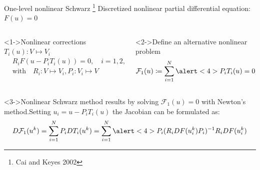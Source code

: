 \begin{frame}{One-level nonlinear Schwarz \footnote{\tiny Cai and Keyes 2002}}%
	Discretized nonlinear partial differential equation: $F(u) = 0$
	\vspace*{-5mm}

	\begin{columns}
		\begin{column}{0.47\textwidth}
			\begin{block}<1->{\normalsize Nonlinear corrections $T_i(u): V\mapsto V_i$}
				\vspace*{-5mm}
				\begin{align*}
					 & R_iF(u-P_iT_i(u))  = 0, \quad i = 1,2,\dots,N                \\
					 & \text{with}\quad R_i:V\mapsto V_i\text{,}\, P_i:V_i\mapsto V
				\end{align*}
			\end{block}
		\end{column}
        \hspace{-3mm}
		\begin{column}{0.47\textwidth}
			\begin{block}<2->{\normalsize Define an alternative nonlinear problem}
				\begin{equation*}
					\mathcal{F}_1(u) \coloneqq \sum_{i=1}^N\alert<4>{P_iT_i(u)} = 0
				\end{equation*}
			\end{block}
		\end{column}
	\end{columns}
			\begin{block}<3->{\normalsize Nonlinear Schwarz method results by solving $\mathcal{F}_1(u) = 0$ with Newton's method.\newline Setting $u_i = u-P_iT_i(u)$ the Jacobian can be formulated as:}
				\vspace*{-2mm}
				\begin{align*}
					D\mathcal{F}_1(u^k)  = \sum_{i = 1}^NP_iDT_i(u^k) = \sum_{i=1}^N\alert<4>{P_i(R_iDF(u_i^k)P_i)^{-1}R_iDF(u_i^k)}
				\end{align*}
			\end{block}

\end{frame}

